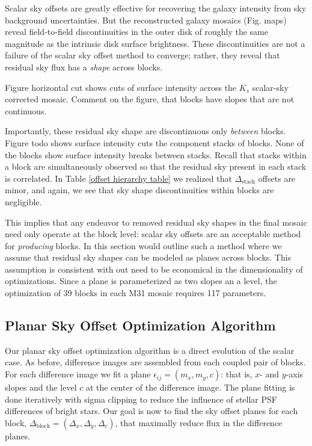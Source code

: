 \documentclass[iop]{emulateapj}
\newcommand{\todo}[1]{\textcolor{RedOrange}{#1}} %
\begin{document}
Scalar sky offsets are greatly effective for recovering the galaxy intensity from sky background uncertainties. But the reconstructed galaxy mosaics (Fig. \todo{maps}) reveal field-to-field discontinuities in the outer disk of roughly the same magnitude as the intrinsic disk surface brightness. These discontinuities are not a failure of the scalar sky offset method to converge; rather, they reveal that residual sky flux has a \emph{shape} across blocks.

Figure \todo{horizontal cut} shows cuts of surface intensity across the $K_s$ scalar-sky corrected mosaic. \todo{Comment on the figure, that blocks have slopes that are not continuous}.

Importantly, these residual sky shape are discontinuous only \emph{between} blocks. Figure \todo{todo} shows surface intensity cuts the component stacks of blocks. None of the blocks show surface intensity breaks between stacks. Recall that stacks within a block are simultaneously observed so that the residual sky present in each stack is correlated. In Table \ref{offset hierarchy table} we realized that $\Delta_\mathrm{stack}$ offsets are minor, and again, we see that sky shape discontinuities within blocks are negligible.

This implies that any endeavor to removed residual sky shapes in the final mosaic need only operate at the block level: scalar sky offsets are an acceptable method for \emph{producing} blocks. In this section would outline such a method where we assume that residual sky shapes can be modeled as planes across blocks. This assumption is consistent with out need to be economical in the dimensionality of optimizations. Since a plane is parameterized as two slopes an a level, the optimization of 39 blocks in each M31 mosaic requires 117 parameters.

\subsection{Planar Sky Offset Optimization Algorithm}

Our planar sky offset optimization algorithm is a direct evolution of the scalar case. As before, difference images are assembled from each coupled pair of blocks. For each difference image we fit a plane $\epsilon_{ij} = (m_x, m_y, c)$: that is, $x$- and $y$-axis slopes and the level $c$ at the center of the difference image. The plane fitting is done iteratively with sigma clipping to reduce the influence of stellar PSF differences of bright stars. Our goal is now to find the sky offset planes for each block, $\Delta_\mathrm{block} = (\Delta_x, \Delta_y, \Delta_c)$, that maximally reduce flux in the difference planes.
\end{document}
